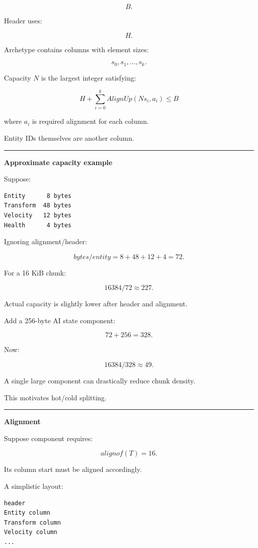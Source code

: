 \[
B.
\]

Header uses:

\[
H.
\]

Archetype contains columns with element sizes:

\[
s_0,s_1,\dots,s_k.
\]

Capacity \(N\) is the largest integer satisfying:

\[
\boxed{
H+
\sum_{i=0}^{k}
AlignUp(Ns_i,a_i)
\le B
}
\]

where \(a_i\) is required alignment for each column.

Entity IDs themselves are another column.

\begin{center}\rule{0.5\linewidth}{0.5pt}\end{center}

\textbf{Approximate capacity example}

Suppose:

\begin{verbatim}
Entity      8 bytes
Transform  48 bytes
Velocity   12 bytes
Health      4 bytes
\end{verbatim}

Ignoring alignment/header:

\[
bytes/entity
=
8+48+12+4
=
72.
\]

For a 16 KiB chunk:

\[
16384/72
\approx227.
\]

Actual capacity is slightly lower after header and alignment.

Add a 256-byte AI state component:

\[
72+256=328.
\]

Now:

\[
16384/328
\approx49.
\]

A single large component can drastically reduce chunk density.

This motivates hot/cold splitting.

\begin{center}\rule{0.5\linewidth}{0.5pt}\end{center}

\textbf{Alignment}

Suppose component requires:

\[
alignof(T)=16.
\]

Its column start must be aligned accordingly.

A simplistic layout:

\begin{verbatim}
header
Entity column
Transform column
Velocity column
...
\end{verbatim}

